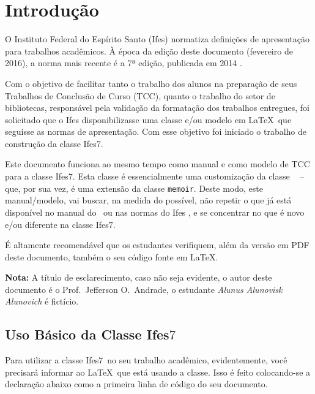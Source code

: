 \documentclass[12pt,times,a4paper,english,brazil,
chapter=TITLE,section=TITLE,subsection=TITLE]{ifes7}
\newcommand{\ifestex}{\textsf{Ifes$7$}}
\begin{document}
\tableofcontents*
\cleardoublepage


\textual

\chapter{Introdução}
\label{cha:introducao}

O Instituto Federal do Espírito Santo (Ifes) normatiza definições de
apresentação para trabalhos acadêmicos. À época da edição deste
documento (fevereiro de 2016), a norma mais recente é a
7ª edição, publicada em 2014 \cite{Ifes2014}.

Com o objetivo de facilitar tanto o trabalho dos alunos na preparação
de seus Trabalhos de Conclusão de Curso (TCC), quanto o trabalho do
setor de bibliotecas, responsável pela validação da formatação dos
trabalhos entregues, foi solicitado que o Ifes disponibilizasse uma
classe e/ou modelo em \LaTeX\ que seguisse as normas de
apresentação. Com esse objetivo foi iniciado o trabalho de construção
da classe \ifestex.

Este documento funciona ao mesmo tempo como manual e como modelo de
TCC para a classe \ifestex. Esta classe é essencialmente uma
customização da classe \abnTeX\ \cite{abntex2classe} -- que, por sua
vez, é uma extensão da classe \texttt{memoir}. Deste modo, este
manual/modelo, vai buscar, na medida do possível, não repetir o que já
está disponível no manual do \abnTeX\ ou nas normas do Ifes
\cite{Ifes2014}, e se concentrar no que é novo e/ou diferente na
classe \ifestex.

É altamente recomendável que os estudantes verifiquem, além da versão
em PDF deste documento, também o seu código fonte em \LaTeX.

\vspace{1.5cm}

\noindent\textbf{Nota:} A título de esclarecimento, caso não seja
evidente, o autor deste documento é o Prof.\ Jefferson O.\ Andrade,
o estudante \emph{Alunus Alunovisk Alunovich} é fictício.


\section{Uso Básico da Classe \ifestex}
\label{sec:uso-basico}

Para utilizar a classe \ifestex\ no seu trabalho acadêmico,
evidentemente, você precisará informar ao \LaTeX\ que está usando a
classe. Isso é feito colocando-se a declaração abaixo como a primeira
linha de código do seu documento.
\end{document}
